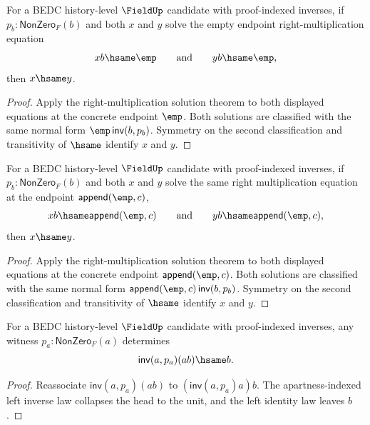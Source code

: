 \begin{theorem}
\label{thm:field-right-mul-empty-equation-solution-unique-from-apartness}
For a BEDC history-level $\FieldUp$ candidate with proof-indexed inverses, if
$p_b:\mathsf{NonZero}_F(b)$ and both $x$ and $y$ solve the empty endpoint
right-multiplication equation
$$
x b\hsame \emp
\qquad\text{and}\qquad
y b\hsame \emp,
$$
then $x\hsame y$.
\end{theorem}
\begin{proof}
Apply the right-multiplication solution theorem to both displayed equations at
the concrete endpoint $\emp$. Both solutions are classified with the same
normal form $\emp\,\mathsf{inv}(b,p_b)$. Symmetry on the second classification
and transitivity of $\hsame$ identify $x$ and $y$.
\end{proof}

\begin{theorem}
\label{thm:field-right-mul-empty-context-equation-solution-unique-from-apartness}
For a BEDC history-level $\FieldUp$ candidate with proof-indexed inverses, if
$p_b:\mathsf{NonZero}_F(b)$ and both $x$ and $y$ solve the same right
multiplication equation at the endpoint $\mathsf{append}(\emp,c)$,
$$
x b\hsame \mathsf{append}(\emp,c)
\qquad\text{and}\qquad
y b\hsame \mathsf{append}(\emp,c),
$$
then $x\hsame y$.
\end{theorem}
\begin{proof}
Apply the right-multiplication solution theorem to both displayed equations at
the concrete endpoint $\mathsf{append}(\emp,c)$. Both solutions are classified
with the same normal form
$\mathsf{append}(\emp,c)\,\mathsf{inv}(b,p_b)$. Symmetry on the second
classification and transitivity of $\hsame$ identify $x$ and $y$.
\end{proof}

\begin{theorem}
\label{thm:field-mul-inverse-left-cancel-from-apartness}
For a BEDC history-level $\FieldUp$ candidate with proof-indexed inverses,
any witness $p_a:\mathsf{NonZero}_F(a)$ determines
$$
\mathsf{inv}(a,p_a)(a b)\hsame b.
$$
\end{theorem}
\begin{proof}
Reassociate $\mathsf{inv}(a,p_a)(a b)$ to
$(\mathsf{inv}(a,p_a)a)b$. The apartness-indexed left inverse law collapses
the head to the unit, and the left identity law leaves $b$.
\end{proof}


